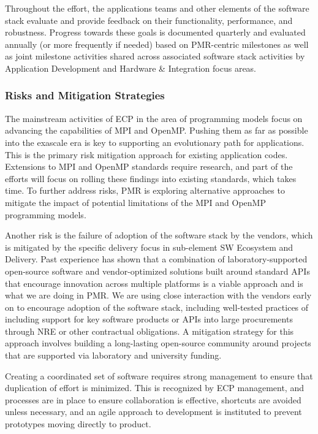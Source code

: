 Throughout the effort, the applications teams and other elements of the software stack evaluate and provide feedback on their functionality, performance, and robustness. Progress towards these goals is documented quarterly and evaluated annually (or more frequently if needed) based on PMR-centric milestones as well as joint milestone activities shared across associated software stack activities by Application Development and Hardware \& Integration focus areas.


\subsubsection{Risks and Mitigation Strategies}
The mainstream activities of ECP in the area of programming models focus on advancing the capabilities of MPI and OpenMP. Pushing them as far as possible into the exascale era is key to supporting an evolutionary path for applications. This is the primary risk mitigation approach for existing application codes. Extensions to MPI and OpenMP standards require research, and part of the efforts will focus on rolling these findings into existing standards, which takes time. To further address risks, PMR is exploring alternative approaches to mitigate the impact of potential limitations of the MPI and OpenMP programming models. 

Another risk is the failure of adoption of the software stack by the vendors, which is mitigated by the specific delivery focus in sub-element SW Ecosystem and Delivery. Past experience has shown that a combination of laboratory-supported open-source software and vendor-optimized solutions built around standard APIs that encourage innovation across multiple platforms is a viable approach and is what we are doing in PMR. We are using close interaction with the vendors early on to encourage adoption of the software stack, including well-tested practices of including support for key software products or APIs into large procurements through NRE or other contractual obligations. A mitigation strategy for this approach involves building a long-lasting open-source community around projects that are supported via laboratory and university funding. 

Creating a coordinated set of software requires strong management to ensure that duplication of effort is minimized. This is recognized by ECP management, and processes are in place to ensure collaboration is effective, shortcuts are avoided unless necessary, and an agile approach to development is instituted to prevent prototypes moving directly to product. 

